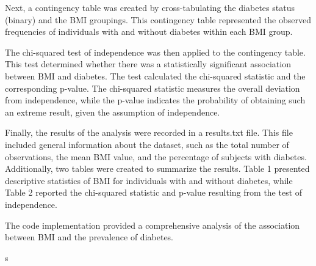 \documentclass[12pt]{article}
\begin{document}
Next, a contingency table was created by cross-tabulating the diabetes status (binary) and the BMI groupings. This contingency table represented the observed frequencies of individuals with and without diabetes within each BMI group.

The chi-squared test of independence was then applied to the contingency table. This test determined whether there was a statistically significant association between BMI and diabetes. The test calculated the chi-squared statistic and the corresponding p-value. The chi-squared statistic measures the overall deviation from independence, while the p-value indicates the probability of obtaining such an extreme result, given the assumption of independence.

Finally, the results of the analysis were recorded in a results.txt file. This file included general information about the dataset, such as the total number of observations, the mean BMI value, and the percentage of subjects with diabetes. Additionally, two tables were created to summarize the results. Table 1 presented descriptive statistics of BMI for individuals with and without diabetes, while Table 2 reported the chi-squared statistic and p-value resulting from the test of independence.

The code implementation provided a comprehensive analysis of the association between BMI and the prevalence of diabetes. 

s
\end{document}
